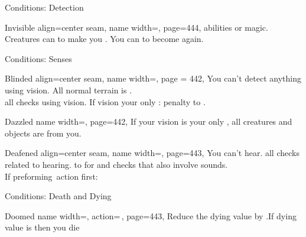 \begin{PageFront}
\begin{Tables}{\frontTableHeight}
\begin{Table}{Conditions: Detection}
\begin{entry}{Invisible}{%
                align=center seam,
                name width=\conditionLength,%
                page=444,
            }
{                abilities or magic.} \\
                Creatures can  to make you \Hidden. You can  to become \Undetected again.
                \hfill {}
            \end{entry}
        \end{Table}
        \TableSpace
        \begin{Table}{Conditions: Senses}
            \begin{entry}{Blinded}{%
                align=center seam,
                name width=\conditionLength,%
                page = 442,
            }
                You can't detect anything using vision. All normal terrain is .
                \hfill {} \\
                 all \PerceptionT checks using vision. If vision your only \PreciseSense:  \Status penalty to \PerceptionT.\hfill {}
            \end{entry}
            \begin{entry}{Dazzled}{%
                name width=\conditionLength,%
                page=442,
            }
                If your vision is your only \PreciseSense, all creatures and objects are \Concealed from you.
            \end{entry}
            \begin{entry}{Deafened}{%
                align=center seam,
                name width=\conditionLength,%
                page=443,
            }
                You can't hear. \hfill{} all checks \PerceptionT related to hearing. \hfill {} to \PerceptionT for  and checks that also involve sounds. \\
                If preforming \Auditory\,action first: \Flat[][val=5]  \hfill {}
            \end{entry}
        \end{Table}
        \TableSpace
        \begin{Table}{Conditions: Death and Dying}
            \begin{entry}{Doomed}{%
                name width=\conditionLength,%
                action=\,\X,
                page=443,
            }
                Reduce the dying value by \X.\quad If dying value is  then you die

\end{entry}
\end{Table}
\end{Tables}
\end{PageFront}
